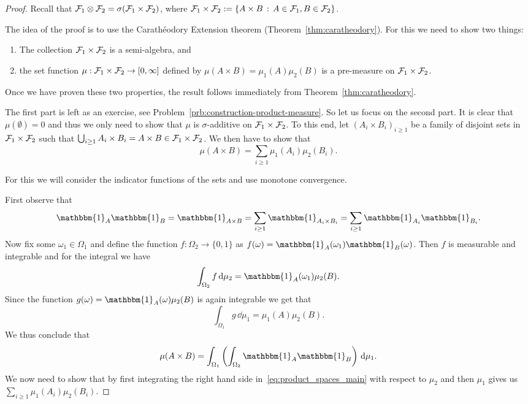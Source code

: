 \begin{proof}
Recall that $\mathcal F_1 \otimes \mathcal F_2 = \sigma(\mathcal F_1 \times \mathcal F_2)$, where $\mathcal F_1 \times \mathcal F_2 := \{A \times B \, : \, A \in \mathcal F_1, B \in \mathcal F_2\}$.

The idea of the proof is to use the Carath\'{e}odory Extension theorem (Theorem~\ref{thm:caratheodory}). For this we need to show two things:
\begin{enumerate}
\item The collection $\mathcal F_1 \times \mathcal F_2$ is a semi-algebra, and
\item the set function $\mu : \mathcal F_1 \times \mathcal F_2 \to [0,\infty]$ defined by $\mu(A \times B) = \mu_1(A) \mu_2(B)$ is a pre-measure on $\mathcal F_1 \times \mathcal F_2$.
\end{enumerate}

Once we have proven these two properties, the result follows immediately from Theorem~\ref{thm:caratheodory}.

The first part is left as an exercise, see Problem~\ref{prb:construction-product-measure}. So let us focus on the second part. It is clear that $\mu(\emptyset) = 0$ and thus we only need to show that $\mu$ is $\sigma$-additive on $\mathcal F_1 \times \mathcal F_2$. To this end, let $(A_i \times B_i)_{i \ge 1}$ be a family of disjoint sets in $\mathcal F_1 \times \mathcal F_2$ such that $\bigcup_{i \ge 1} A_i \times B_i = A \times B \in \mathcal F_1 \times \mathcal F_2$. We then have to show that
\[
	\mu(A \times B) = \sum_{i \ge 1} \mu_1(A_i) \mu_2(B_i).
\]

For this we will consider the indicator functions of the sets and use monotone convergence. 

First observe that
\begin{equation}\label{eq:product_spaces_main}
	\mathbbm{1}_{A} \mathbbm{1}_{B} = \mathbbm{1}_{A \times B} 
	= \sum_{i \ge 1} \mathbbm{1}_{A_i \times B_i} = \sum_{i \ge 1} \mathbbm{1}_{A_i} \mathbbm{1}_{B_i}.
\end{equation}
Now fix some $\omega_1 \in \Omega_1$ and define the function $f : \Omega_2 \to \{0,1\}$ as $f(\omega) = \mathbbm{1}_{A}(\omega_1) \mathbbm{1}_{B}(\omega)$. Then $f$ is measurable and integrable and for the integral we have
\[
	\int_{\Omega_2} f \, \dd \mu_2 = \mathbbm{1}_{A}(\omega_1) \mu_2(B).
\]
Since the function $g(\omega) = \mathbbm{1}_{A}(\omega) \mu_2(B)$ is again integrable we get that
\[
	\int_{\Omega_1} g \, \dd \mu_1 = \mu_1(A) \mu_2(B).
\]
We thus conclude that
\[
	\mu(A \times B) = \int_{\Omega_1} \left(\int_{\Omega_2} \mathbbm{1}_{A} \mathbbm{1}_{B} \right) \, \dd \mu_1.
\]
We now need to show that by first integrating the right hand side in~\eqref{eq:product_spaces_main} with respect to $\mu_2$ and then $\mu_1$ gives us $\sum_{i \ge 1} \mu_1(A_i) \mu_2(B_i)$.


\end{proof}
